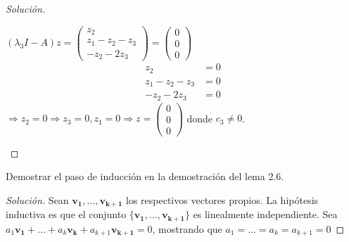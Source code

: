 \documentclass[12pt]{book}
\newenvironment{solucion}
  {\renewcommand\qedsymbol{$\square$}\begin{proof}[Solución]}
  {\end{proof}}
\begin{document}
\begin{solucion}
\begin{itemize}
        $(\lambda_3I-A)z=\begin{pmatrix}
        z_2\\
        z_1-z_2-z_3\\
        -z_2-2z_3
        \end{pmatrix}=\begin{pmatrix}
        0\\
        0\\
        0
        \end{pmatrix}$\\
        \begin{align*}
            z_2&=0\\
            z_1-z_2-z_3&=0\\
            -z_2-2z_3&=0
        \end{align*}
        $\Rightarrow z_2 = 0 \Rightarrow z_3=0, z_1=0\Rightarrow z= \begin{pmatrix}
        0\\
        0\\
        0
        \end{pmatrix}$ donde $c_3 \neq 0$.\\
\end{itemize}

\end{solucion}

\eje Demostrar el paso de inducción en la demostración del lema 2.6.
\begin{solucion}
    Sean $\bm{v_1},\dots,\bm{v_{k+1}}$ los respectivos vectores propios. La hipótesis inductiva es que el conjunto $\{\bm{v_1},\dots,\bm{v_{k+1}}\}$ es linealmente independiente. Sea $a_1\bm{v_1}+\dots+a_k\bm{v_k}+a_{k+1}\bm{v_{k+1}}=0$, mostrando que $a_1=\dots=a_k=a_{k+1}=0$
\end{solucion}
\end{document}
